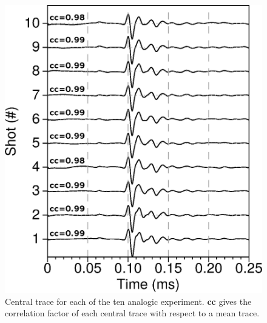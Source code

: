 \documentclass[manuscript,revised]{geophysics}
\begin{document}
\begin{figure}[!h]
	\centering
	\includegraphics[scale=1.0]{fig/musc_F50_CT.eps}
	\caption{Central trace for each of the ten analogic experiment. \textbf{cc} gives the correlation factor of each central trace with respect to a mean trace.}
	\label{panel_central_traces_cc}
\end{figure}
\end{document}
